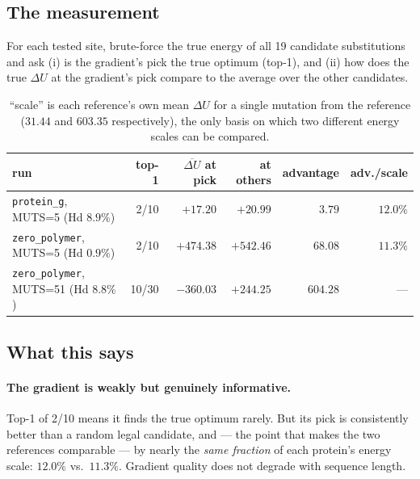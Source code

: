 \documentclass[11pt,a4paper]{article}
\begin{document}
\subsection{The measurement}

For each tested site, brute-force the true energy of all 19 candidate
substitutions and ask (i) is the gradient's pick the true optimum (top-1),
and (ii) how does the true $\Delta U$ at the gradient's pick compare to the
average over the other candidates.

\begin{table}[htbp]
\centering
\small\setlength{\tabcolsep}{4pt}
\begin{tabular}{l r r r r r}
\toprule
run & top-1 & $\overline{\Delta U}$ at pick & at others & advantage
    & adv./scale \\
\midrule
\texttt{protein\_g}, MUTS=5 (Hd $8.9\%$)   & 2/10  & $+17.20$  & $+20.99$  & $3.79$   & $12.0\%$ \\
\texttt{zero\_polymer}, MUTS=5 (Hd $0.9\%$) & 2/10  & $+474.38$ & $+542.46$ & $68.08$  & $11.3\%$ \\
\texttt{zero\_polymer}, MUTS=51 (Hd $8.8\%$)& 10/30 & $\mathbf{-360.03}$ & $+244.25$ & $604.28$ & --- \\
\bottomrule
\end{tabular}
\caption{``scale'' is each reference's own mean $\Delta U$ for a single
mutation from the reference ($31.44$ and $603.35$ respectively), the only
basis on which two different energy scales can be compared.}
\label{tab:quality}
\end{table}

\subsection{What this says}

\paragraph{The gradient is weakly but genuinely informative.} Top-1 of 2/10
means it finds the true optimum rarely. But its pick is consistently better
than a random legal candidate, and --- the point that makes the two
references comparable --- by nearly the \emph{same fraction} of each
protein's energy scale: $12.0\%$ vs.\ $11.3\%$. Gradient quality does not
degrade with sequence length.
\end{document}
